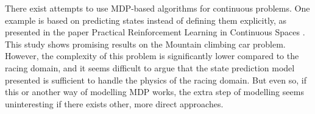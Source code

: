 There exist attempts to use MDP-based algorithms for continuous problems. One example is based on predicting states instead of defining them explicitly, as presented in the paper Practical Reinforcement Learning in Continuous Spaces \cite{smart}. This study shows promising results on the Mountain climbing car problem. However, the complexity of this problem is significantly lower compared to the racing domain, and it seems difficult to argue that the state prediction model presented is sufficient to handle the physics of the racing domain. But even so, if this or another way of modelling MDP works, the extra step of modelling seems uninteresting if there exists other, more direct approaches.




